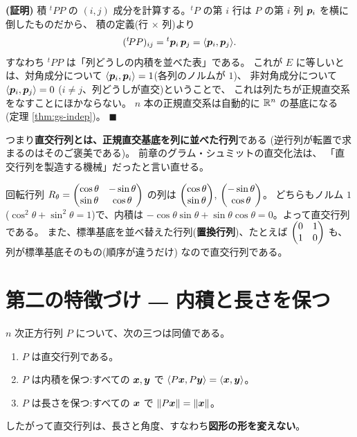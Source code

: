 \noindent\textbf{(証明)}\quad
積 ${}^t\!P P$ の $(i, j)$ 成分を計算する。${}^t\!P$ の第 $i$ 行は
$P$ の第 $i$ 列 $\bm{p}_i$ を横に倒したものだから、
積の定義(行 $\times$ 列)より
\[
({}^t\!P P)_{ij} = {}^t\bm{p}_i\,\bm{p}_j
= \langle \bm{p}_i, \bm{p}_j \rangle.
\]
すなわち ${}^t\!P P$ は「列どうしの内積を並べた表」である。
これが $E$ に等しいとは、対角成分について
$\langle \bm{p}_i, \bm{p}_i \rangle = 1$(各列のノルムが $1$)、
非対角成分について $\langle \bm{p}_i, \bm{p}_j \rangle = 0$
($i \neq j$、列どうしが直交)ということで、
これは列たちが正規直交系をなすことにほかならない。
$n$ 本の正規直交系は自動的に $\mathbb{R}^n$ の基底になる
(定理 \ref{thm:gs-indep})。 $\blacksquare$

つまり\textbf{直交行列とは、正規直交基底を列に並べた行列}である
(逆行列が転置で求まるのはそのご褒美である)。
前章のグラム・シュミットの直交化法は、
「直交行列を製造する機械」だったと言い直せる。

\begin{rei}[回転行列と置換行列]\label{rei:orth-examples}
回転行列 $R_\theta = \begin{pmatrix}\cos\theta & -\sin\theta \\ \sin\theta & \cos\theta\end{pmatrix}$
の列は $\begin{pmatrix}\cos\theta \\ \sin\theta\end{pmatrix}$, $\begin{pmatrix}-\sin\theta \\ \cos\theta\end{pmatrix}$。
どちらもノルム $1$($\cos^2\theta + \sin^2\theta = 1$)で、内積は
$-\cos\theta\sin\theta + \sin\theta\cos\theta = 0$。よって直交行列である。
また、標準基底を並べ替えた行列(\textbf{置換行列})、たとえば
$\begin{pmatrix}0 & 1 \\ 1 & 0\end{pmatrix}$ も、列が標準基底そのもの(順序が違うだけ)
なので直交行列である。
\end{rei}

\section{第二の特徴づけ ― 内積と長さを保つ}

\begin{teiri}[直交行列の保存性質]\label{thm:orth-preserve}
$n$ 次正方行列 $P$ について、次の三つは同値である。
\begin{enumerate}
\item $P$ は直交行列である。
\item $P$ は内積を保つ:すべての $\bm{x}, \bm{y}$ で
$\langle P\bm{x}, P\bm{y} \rangle = \langle \bm{x}, \bm{y} \rangle$。
\item $P$ は長さを保つ:すべての $\bm{x}$ で
$\|P\bm{x}\| = \|\bm{x}\|$。
\end{enumerate}
したがって直交行列は、長さと角度、すなわち\textbf{図形の形を変えない}。
\end{teiri}

